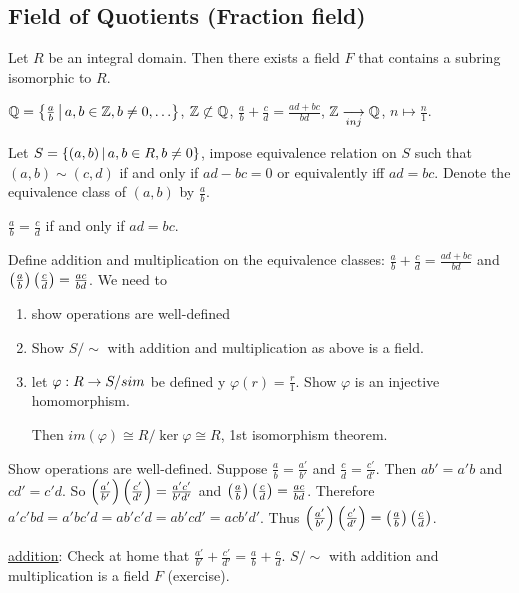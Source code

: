 \documentclass[]{article}
\begin{document}
\subsection{Field of Quotients (Fraction field)}
Let $R$ be an integral domain. Then there exists a field $F$ that contains a subring isomorphic to $R$.
\begin{example}
	[$\mb Z= R$, $\mb Q = F$]
	$\mb Q=\setm{\frac ab}{a,b\in\mb Z,b\neq0,\dots}$, $\mathbb{Z}\not\subset\mathbb{Q}$, $\frac ab+\frac cd=\frac{ad+bc}{bd}$, $\mathbb{Z}\underset{inj}{\longrightarrow}\mathbb{Q}$, $n\mapsto\frac n1$.

	Let $S=\left\{ (a,b) \, \middle| \, a,b\in R,b\neq0 \right\}$, impose equivalence relation on $S$ such that $(a,b)\sim(c,d)$ if and only if $ad-bc=0$ or equivalently iff $ad=bc$.
	Denote the equivalence class of $(a,b)$ by $\frac ab$.
	\begin{note}
		$\frac ab=\frac cd$ if and only if $ad=bc$.
	\end{note}
	Define addition and multiplication on the equivalence classes: $\frac ab+\frac cd=\frac{ad+bc}{bd}$ and $\left(\frac ab\right)\left(\frac cd\right)=\frac{ac}{bd}$.
	We need to
	\begin{enumerate}
		\item show operations are well-defined
		\item Show $S/\sim$ with addition and multiplication as above is a field.
		\item let $\varphi:R\rightarrow S/sim$ be defined y $\varphi(r)=\frac r1$. Show $\varphi$ is an injective homomorphism.
			\begin{note}
				Then $im(\varphi)\cong R/\ker\varphi\cong R$, 1st isomorphism theorem.
			\end{note}
	\end{enumerate}
	Show operations are well-defined.
	Suppose $\frac ab=\frac{a'}{b'}$ and $\frac cd=\frac{c'}{d'}$.
	Then $ab'=a'b$ and $cd'=c'd$.
	So $\left(\frac{a'}{b'}\right)\left(\frac{c'}{d'}\right)=\frac{a'c'}{b'd'}$ and $\left(\frac ab\right)\left(\frac cd\right)=\frac{ac}{bd}$.
	Therefore $a'c'bd=a'bc'd=ab'c'd=ab'cd'=acb'd'$.
	Thus $\left(\frac{a'}{b'}\right)\left(\frac{c'}{d'}\right)=\left(\frac ab\right){\left(\frac cd\right)}$.

	\ul{addition}: Check at home that $\frac{a'}{b'}+\frac{c'}{d'}=\frac ab+\frac cd$.
	$S/\sim$ with addition and multiplication is a field $F$ (exercise).
\end{example}
\end{document}
